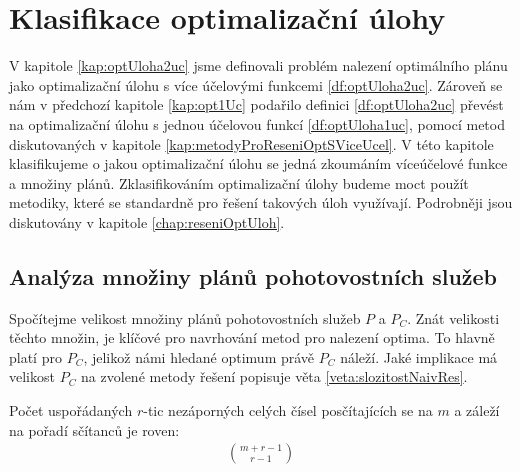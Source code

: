 \section{Klasifikace optimalizační úlohy}

V kapitole \ref{kap:optUloha2uc} jsme definovali problém nalezení optimálního plánu jako optimalizační úlohu s více účelovými funkcemi \ref{df:optUloha2uc}.
Zároveň se nám v předchozí kapitole \ref{kap:opt1Uc} podařilo definici \ref{df:optUloha2uc} převést na optimalizační úlohu s jednou účelovou funkcí \ref{df:optUloha1uc},
pomocí metod diskutovaných v kapitole \ref{kap:metodyProReseniOptSViceUcel}.
V této kapitole klasifikujeme o jakou optimalizační úlohu se jedná zkoumáním víceúčelové funkce a množiny plánů.
Zklasifikováním optimalizační úlohy budeme moct použít metodiky, které se standardně pro řešení takových úloh využívají. 
Podrobněji jsou diskutovány v kapitole \ref{chap:reseniOptUloh}.

\subsection{Analýza množiny plánů pohotovostních služeb}\label{kap:analP}

Spočítejme velikost množiny plánů pohotovostních služeb $P$ a $P_C$.
Znát velikosti těchto množin, je klíčové pro navrhování metod pro nalezení optima.
To hlavně platí pro $P_C$, jelikož námi hledané optimum právě $P_C$ náleží.
Jaké implikace má velikost $P_C$ na zvolené metody řešení popisuje věta \ref{veta:slozitostNaivRes}.

\begin{lemma}\label{lemma:pocetRtic}
  Počet uspořádaných $r$-tic nezáporných celých čísel posčítajících se na $m$ a záleží na pořadí sčítanců je roven: 
  \begin{align*}
    \binom{m + r - 1}{r - 1}
  \end{align*}
  \\
\end{lemma}

